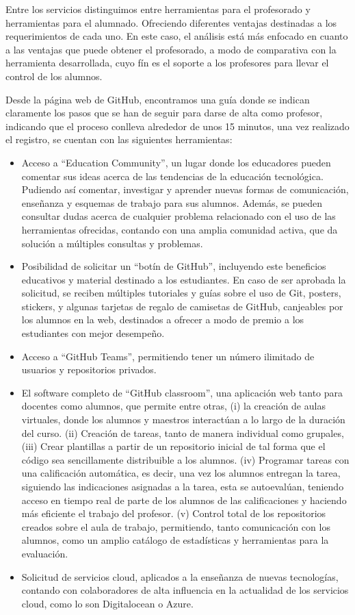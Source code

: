 Entre los servicios distinguimos entre herramientas para el profesorado y
herramientas para el alumnado. Ofreciendo diferentes ventajas destinadas a
los requerimientos de cada uno. En este caso, el análisis está más enfocado
en cuanto a las ventajas que puede obtener el profesorado, a modo de
comparativa con la herramienta desarrollada, cuyo fín es el soporte a los
profesores para llevar el control de los alumnos.

Desde la página web de GitHub, encontramos una guía donde se indican
claramente los pasos que se han de seguir para darse de alta como profesor,
indicando que el proceso conlleva alrededor de unos 15 minutos, una vez
realizado el registro, se cuentan con las siguientes herramientas:
\begin{itemize}
\item Acceso a ``Education Community'', un lugar donde los educadores
  pueden comentar sus ideas acerca de las tendencias de la educación
  tecnológica. Pudiendo así comentar, investigar y aprender nuevas formas
  de comunicación, enseñanza y esquemas de trabajo para sus alumnos.
  Además, se pueden consultar dudas acerca de cualquier problema
  relacionado con el uso de las herramientas ofrecidas, contando con una
  amplia comunidad activa, que da solución a múltiples consultas y
  problemas.
\item Posibilidad de solicitar un ``botín de GitHub'', incluyendo este
  beneficios educativos y material destinado a los estudiantes. En caso de
  ser aprobada la solicitud, se reciben múltiples tutoriales y guías sobre
  el uso de Git, posters, stickers, y algunas tarjetas de regalo de
  camisetas de GitHub, canjeables por los alumnos en la web, destinados a
  ofrecer a modo de premio a los estudiantes con mejor desempeño.
\item Acceso a ``GitHub Teams'', permitiendo tener un número ilimitado de
  usuarios y repositorios privados.
\item El software completo de ``GitHub classroom'', una aplicación web
  tanto para docentes como alumnos, que permite entre otras, (i) la
  creación de aulas virtuales, donde los alumnos y maestros interactúan a
  lo largo de la duración del curso. (ii) Creación de tareas, tanto de
  manera individual como grupales, (iii) Crear plantillas a partir de un
  repositorio inicial de tal forma que el código sea sencillamente
  distribuible a los alumnos. (iv) Programar tareas con una calificación
  automática, es decir, una vez los alumnos entregan la tarea, siguiendo
  las indicaciones asignadas a la tarea, esta se autoevalúan, teniendo
  acceso en tiempo real de parte de los alumnos de las calificaciones y
  haciendo más eficiente el trabajo del profesor. (v) Control total de los
  repositorios creados sobre el aula de trabajo, permitiendo, tanto
  comunicación con los alumnos, como un amplio catálogo de estadísticas y
  herramientas para la evaluación.
\item Solicitud de servicios cloud, aplicados a la enseñanza de nuevas
  tecnologías, contando con colaboradores de alta influencia en la
  actualidad de los servicios cloud, como lo son Digitalocean o Azure.
\end{itemize}

